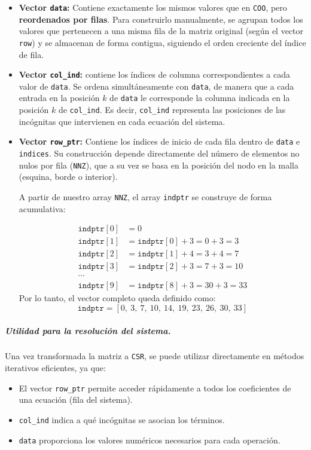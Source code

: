 \documentclass{article}
\begin{document}
\begin{itemize}
    \item \textbf{Vector \texttt{data}:} Contiene exactamente los mismos valores que en \texttt{COO}, pero \textbf{reordenados por filas}. Para construirlo manualmente, se agrupan todos los valores que pertenecen a una misma fila de la matriz original (según el vector \texttt{row}) y se almacenan de forma contigua, siguiendo el orden creciente del índice de fila. 
    \item \textbf{Vector \texttt{col\_ind}:} contiene los índices de columna correspondientes a cada valor de \texttt{data}. Se ordena simultáneamente con \texttt{data}, de manera que a cada entrada en la posición $k$ de \texttt{data} le corresponde la columna indicada en la posición $k$ de \texttt{col\_ind}. Es decir, \texttt{col\_ind} representa las posiciones de las incógnitas que intervienen en cada ecuación del sistema.
    \item \textbf{Vector \texttt{row\_ptr}:} Contiene los índices de inicio de cada fila dentro de \texttt{data} e \texttt{indices}. Su construcción depende directamente del número de elementos no nulos por fila (\texttt{NNZ}), que a su vez se basa en la posición del nodo en la malla (esquina, borde o interior).

    A partir de nuestro array \texttt{NNZ}, el array \texttt{indptr} se construye de forma acumulativa:

    $$
    \begin{aligned}
    \texttt{indptr}[0] &= 0 \\
    \texttt{indptr}[1] &= \texttt{indptr}[0] + 3 = 0 + 3 = 3 \\
    \texttt{indptr}[2] &= \texttt{indptr}[1] + 4 = 3 + 4 = 7 \\
    \texttt{indptr}[3] &= \texttt{indptr}[2] + 3 = 7 + 3 = 10 \\
    \cdots \\
    \texttt{indptr}[9] &= \texttt{indptr}[8] + 3 = 30 + 3 = 33
    \end{aligned}
    $$
    \noindent
    Por lo tanto, el vector completo queda definido como:
    $$
    \texttt{indptr} = [0,\ 3,\ 7,\ 10,\ 14,\ 19,\ 23,\ 26,\ 30,\ 33]
    $$
\end{itemize}

\subparagraph{Utilidad para la resolución del sistema.} Una vez transformada la matriz a \texttt{CSR}, se puede utilizar directamente en métodos iterativos eficientes, ya que:

\begin{itemize}
    \item El vector \texttt{row\_ptr} permite acceder rápidamente a todos los coeficientes de una ecuación (fila del sistema).
    \item \texttt{col\_ind} indica a qué incógnitas se asocian los términos.
    \item \texttt{data} proporciona los valores numéricos necesarios para cada operación.
\end{itemize}
\end{document}
